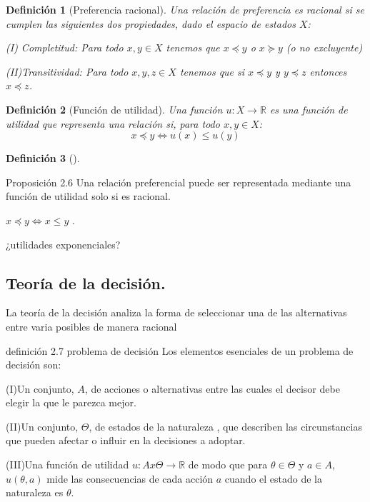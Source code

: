 \documentclass[14pt, a4paper]{article} %
\newcommand{\R}{\ensuremath{\mathbb{R}}}
\newtheorem{definicion}{Definición}[section]
\begin{document}
\begin{definicion}[Preferencia racional]
Una relación de preferencia es racional si se cumplen las siguientes dos propiedades, dado el espacio de estados $X$:

(I) Completitud: Para todo $x,y \in X$ tenemos que $x \preceq y$ o $x \succeq y$ (o no excluyente)

(II)Transitividad: Para todo $x, y, z \in X$ tenemos que si $x \preceq y$ y $y \preceq z$ entonces $x \preceq z$.
\end{definicion}

\begin{definicion}[Función de utilidad]
Una función $u:X \to \R$ es una función de utilidad que representa una relación si, para todo $x,y \in X$:
$$ 
x \preceq y \iff u(x)\le u(y)
$$

\end{definicion}
\begin{definicion}[]

\end{definicion}










Proposición 2.6 
Una relación preferencial puede ser representada mediante una función de utilidad solo si es racional.

$x \preceq y \iff x \le y$ .

¿utilidades exponenciales?

\subsection{Teoría de la decisión.}


La teoría de la decisión analiza la forma de seleccionar una de las alternativas entre varia posibles de manera racional

definición 2.7 problema de decisión  
 Los elementos esenciales de un problema de decisión son:
  
  (I)Un conjunto, $A$, de acciones o alternativas entre las cuales el decisor debe elegir la que le parezca mejor.
  
  (II)Un conjunto, $\Theta$, de estados de la naturaleza , que describen las circunstancias que pueden afectar o influir en la decisiones a adoptar.
  
(III)Una función de utilidad $u:Ax\Theta \to \R$ de modo que  para $\theta \in \Theta $ y $a \in A$, $u(\theta , a)$ mide las consecuencias de cada acción $a$ cuando el estado de la naturaleza es $\theta$.\\
   
\end{document}

